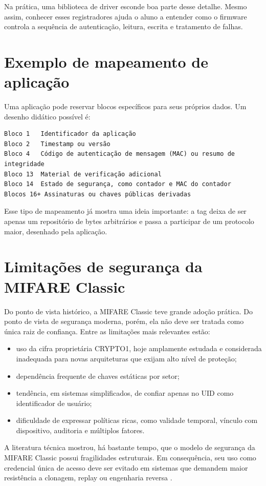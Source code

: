 Na prática, uma biblioteca de driver esconde boa parte desse detalhe. Mesmo assim, conhecer esses registradores ajuda o aluno a entender como o firmware controla a sequência de autenticação, leitura, escrita e tratamento de falhas.

\section{Exemplo de mapeamento de aplicação}
Uma aplicação pode reservar blocos específicos para seus próprios dados. Um desenho didático possível é:
\begin{verbatim}
Bloco 1   Identificador da aplicação
Bloco 2   Timestamp ou versão
Bloco 4   Código de autenticação de mensagem (MAC) ou resumo de integridade
Bloco 13  Material de verificação adicional
Bloco 14  Estado de segurança, como contador e MAC do contador
Blocos 16+ Assinaturas ou chaves públicas derivadas
\end{verbatim}

Esse tipo de mapeamento já mostra uma ideia importante: a tag deixa de ser apenas um repositório de bytes arbitrários e passa a participar de um protocolo maior, desenhado pela aplicação.

\section{Limitações de segurança da MIFARE Classic}
Do ponto de vista histórico, a MIFARE Classic teve grande adoção prática. Do ponto de vista de segurança moderna, porém, ela não deve ser tratada como única raiz de confiança. Entre as limitações mais relevantes estão:
\begin{itemize}[leftmargin=*]
  \item uso da cifra proprietária CRYPTO1, hoje amplamente estudada e considerada inadequada para novas arquiteturas que exijam alto nível de proteção;
  \item dependência frequente de chaves estáticas por setor;
  \item tendência, em sistemas simplificados, de confiar apenas no UID como identificador de usuário;
  \item dificuldade de expressar políticas ricas, como validade temporal, vínculo com dispositivo, auditoria e múltiplos fatores.
\end{itemize}

A literatura técnica mostrou, há bastante tempo, que o modelo de segurança da MIFARE Classic possui fragilidades estruturais. Em consequência, seu uso como credencial única de acesso deve ser evitado em sistemas que demandem maior resistência a clonagem, replay ou engenharia reversa \citep{garcia_dismantling_mifare,gans_practical_attack_mifare}.

